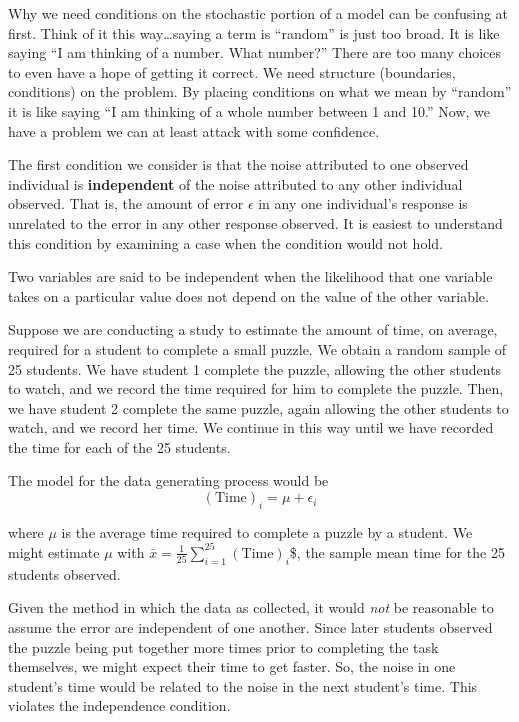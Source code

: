 \documentclass[]{book}
\theoremstyle{plain}
\theoremstyle{mydefn}
\theoremstyle{myexmpl}
\theoremstyle{remark}
\let\BeginKnitrBlock\begin \let\EndKnitrBlock\end
\let\BeginKnitrBlock\begin \let\EndKnitrBlock\end
\begin{document}
\BeginKnitrBlock{rmdtip}
Why we need conditions on the stochastic portion of a model can be
confusing at first. Think of it this way\ldots{}saying a term is
``random'' is just too broad. It is like saying ``I am thinking of a
number. What number?'' There are too many choices to even have a hope of
getting it correct. We need structure (boundaries, conditions) on the
problem. By placing conditions on what we mean by ``random'' it is like
saying ``I am thinking of a whole number between 1 and 10.'' Now, we
have a problem we can at least attack with some confidence.
\EndKnitrBlock{rmdtip}

The first condition we consider is that the noise attributed to one
observed individual is \textbf{independent} of the noise attributed to
any other individual observed. That is, the amount of error \(\epsilon\)
in any one individual's response is unrelated to the error in any other
response observed. It is easiest to understand this condition by
examining a case when the condition would not hold.

\BeginKnitrBlock{definition}[Independence]
\protect\hypertarget{def:defn-independence}{}{\label{def:defn-independence}
{} }Two variables are said to be independent
when the likelihood that one variable takes on a particular value does
not depend on the value of the other variable.
\EndKnitrBlock{definition}

\BeginKnitrBlock{example}[Puzzle Speed]
\protect\hypertarget{exm:ex-puzzles}{}{\label{exm:ex-puzzles}
{} }Suppose we are conducting a study to
estimate the amount of time, on average, required for a student to
complete a small puzzle. We obtain a random sample of 25 students. We
have student 1 complete the puzzle, allowing the other students to
watch, and we record the time required for him to complete the puzzle.
Then, we have student 2 complete the same puzzle, again allowing the
other students to watch, and we record her time. We continue in this way
until we have recorded the time for each of the 25 students.

The model for the data generating process would be
\[(\text{Time})_i = \mu + \epsilon_i\]

where \(\mu\) is the average time required to complete a puzzle by a
student. We might estimate \(\mu\) with
\(\bar{x} = \frac{1}{25}\sum_{i=1}^{25} (\text{Time})_i\)\$, the sample
mean time for the 25 students observed.

Given the method in which the data as collected, it would \emph{not} be
reasonable to assume the error are independent of one another. Since
later students observed the puzzle being put together more times prior
to completing the task themselves, we might expect their time to get
faster. So, the noise in one student's time would be related to the
noise in the next student's time. This violates the independence
condition.
\EndKnitrBlock{example}
\end{document}
